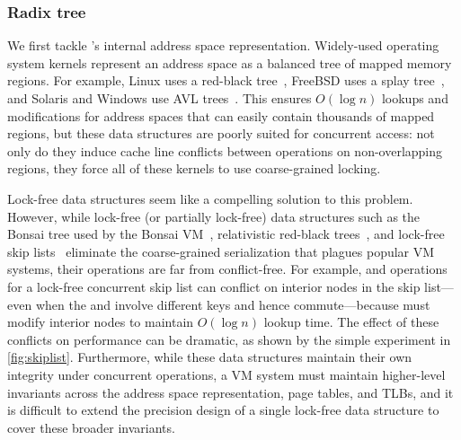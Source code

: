 \subsubsection{Radix tree}
\label{sec:radixvm:tree}
\label{sec:topic:linux-coarse}


  

We first tackle \vm's internal address space representation.
%
Widely-used operating system kernels represent an address space as a
balanced tree of mapped memory regions.  For example, Linux uses a
red-black tree~\cite{linux-source}, FreeBSD uses a splay
tree~\cite{freebsd-source}, and Solaris and Windows use AVL
trees~\cite{windows:wrk,windows:slides}.  This ensures $O(\log n)$ lookups
and modifications for address spaces that can easily contain thousands
of mapped regions, but these data structures are poorly suited for
concurrent access: not only do they induce cache line conflicts
between operations on non-overlapping regions, they force all of these
kernels to use coarse-grained locking.

Lock-free data structures seem like a compelling solution to this
problem.  However, while lock-free (or partially lock-free) data
structures such as the Bonsai tree used by the Bonsai
VM~\cite{clements:bonsai}, relativistic red-black
trees~\cite{howard:relrbtree}, and lock-free skip
lists~\cite{herlihy:art} eliminate the coarse-grained serialization
that plagues popular VM systems, their operations are far from
conflict-free.  For example,  and 
operations for a lock-free concurrent skip list can conflict on
interior nodes in the skip list---even when the  and
 involve different keys and hence commute---because
 must modify interior nodes to maintain $O(\log n)$
lookup time.
%
The effect of these conflicts on performance can be dramatic, as shown
by the simple experiment in \cref{fig:skiplist}.
Furthermore, while these data structures maintain their own integrity
under concurrent operations, a VM system must maintain higher-level
invariants across the address space representation, page tables, and
TLBs, and it is difficult to extend the precision design of a single
lock-free data structure to cover these broader invariants.

